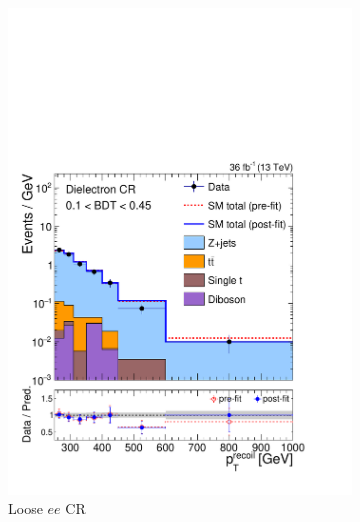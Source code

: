 \begin{figure}[]
\begin{center}
\begin{subfigure}[t]{0.24\textwidth}
            \includegraphics[width=\textwidth]{figures/monotop/postfit/stackedPostfit_dielectron_monotop_loose.pdf}
            \caption{Loose $ee$ CR}
        \end{subfigure}
        \begin{subfigure}[t]{0.24\textwidth}

\end{subfigure}
\end{center}
\end{figure}
